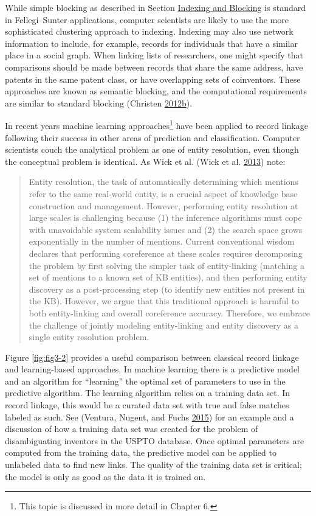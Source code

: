 \documentclass[]{krantz}
\begin{document}
While simple blocking as described in Section
\protect\hyperlink{S:indexing}{Indexing and Blocking} is standard in
Fellegi--Sunter applications, computer scientists are likely to use the
more sophisticated clustering approach to indexing. Indexing may also
use network information to include, for example, records for individuals
that have a similar place in a social graph. When linking lists of
researchers, one might specify that comparisons should be made between
records that share the same address, have patents in the same patent
class, or have overlapping sets of coinventors. These approaches are
known as semantic blocking, and the computational requirements are
similar to standard blocking (Christen
\protect\hyperlink{ref-christen2012data}{2012}\protect\hyperlink{ref-christen2012data}{b}).

In recent years machine learning approaches\footnote{This topic is
  discussed in more detail in Chapter 6.} have been applied to record
linkage following their success in other areas of prediction and
classification. Computer scientists couch the analytical problem as one
of entity resolution, even though the conceptual problem is identical.
As Wick et al. (Wick et al. \protect\hyperlink{ref-wick2013joint}{2013})
note:

\begin{quote}
Entity resolution, the task of automatically determining which mentions
refer to the same real-world entity, is a crucial aspect of knowledge
base construction and management. However, performing entity resolution
at large scales is challenging because (1) the inference algorithms must
cope with unavoidable system scalability issues and (2) the search space
grows exponentially in the number of mentions. Current conventional
wisdom declares that performing coreference at these scales requires
decomposing the problem by first solving the simpler task of
entity-linking (matching a set of mentions to a known set of KB
entities), and then performing entity discovery as a post-processing
step (to identify new entities not present in the KB). However, we argue
that this traditional approach is harmful to both entity-linking and
overall coreference accuracy. Therefore, we embrace the challenge of
jointly modeling entity-linking and entity discovery as a single entity
resolution problem.
\end{quote}

Figure \ref{fig:fig3-2} provides a useful comparison between classical
record linkage and learning-based approaches. In machine learning there
is a predictive model and an algorithm for ``learning'' the optimal set
of parameters to use in the predictive algorithm. The learning algorithm
relies on a training data set. In record linkage, this would be a
curated data set with true and false matches labeled as such. See
(Ventura, Nugent, and Fuchs
\protect\hyperlink{ref-ventura2015seeing}{2015}) for an example and a
discussion of how a training data set was created for the problem of
disambiguating inventors in the USPTO database. Once optimal parameters
are computed from the training data, the predictive model can be applied
to unlabeled data to find new links. The quality of the training data
set is critical; the model is only as good as the data it is trained on.
\end{document}
